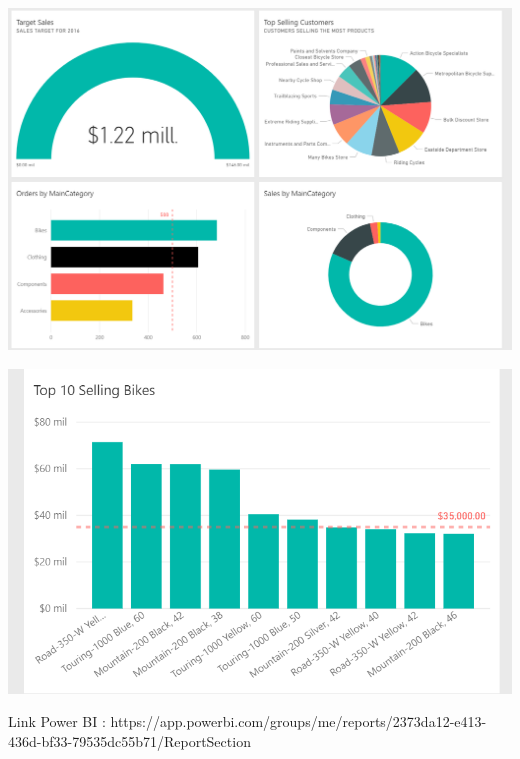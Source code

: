 \begin{itemize}
\begin{enumerate}
\begin{center}
\includegraphics[scale=0.60]{./Imagenes/ejer3_panel1.png}
\end{center}
\begin{center}
\includegraphics[scale=0.55]{./Imagenes/ejer3_panel2.png}
\end{center}

Link Power BI : https://app.powerbi.com/groups/me/reports/2373da12-e413-436d-bf33-79535dc55b71/ReportSection

\end{enumerate}

\end{itemize}


